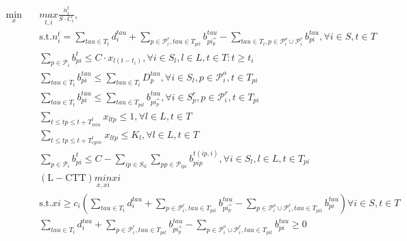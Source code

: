 \begin{align}
  \min_{x}\quad & \underset{t , i}{max} \frac{n_{i}^{t}}{S \cdot C_{i}} , \tag{eq\_0007} \\
  & \text{s}.\text{t}. n_{i}^{t} = \sum_{\mathit{tau} \in T_{t}} d_{i}^{\mathit{tau}} + \sum_{p \in \mathcal{P}_{i}^{r}, \mathit{tau} \in T_{p i t}} b_{p i_{p}^{+}}^{\mathit{tau}} - \sum_{\mathit{tau} \in T_{t}, p \in \mathcal{P}_{i}^{o} \cup \mathcal{P}_{i}^{r}} b_{p i}^{\mathit{tau}} , \forall i \in S , t \in T \tag{eq\_0008} \\
  & \sum_{p \in \mathcal{P}_{i}} b_{p i}^{t} \leq C \cdot x_{l \left(t - t_{i}\right)} , \forall i \in S_{l} , l \in L , t \in T : t \geq t_{i} \tag{eq\_0009} \\
  & \sum_{\mathit{tau} \in T_{t}} b_{p i}^{\mathit{tau}} \leq \sum_{\mathit{tau} \in T_{t}} D_{p}^{\mathit{tau}} , \forall i \in S_{l} , p \in \mathcal{P}_{i}^{o} , t \in T_{p i} \tag{eq\_0010} \\
  & \sum_{\mathit{tau} \in T_{t}} b_{p i}^{\mathit{tau}} \leq \sum_{\mathit{tau} \in T_{p i t}} b_{p i_{p}^{+}}^{\mathit{tau}} , \forall i \in S_{p}^{r} , p \in \mathcal{P}_{i}^{r} , t \in T_{p i} \tag{eq\_0011} \\
  & \sum_{t \leq tp \leq t + T_{m i n}^{l}} x_{l tp} \leq 1 , \forall l \in L , t \in T \tag{eq\_0012} \\
  & \sum_{t \leq tp \leq t + T_{c y c l e}^{l}} x_{l tp} \leq K_{l} , \forall l \in L , t \in T \tag{eq\_0013} \\
  & \sum_{p \in \mathcal{P}_{i}} b_{p i}^{t} \leq C - \sum_{ip \in S_{i l}} \underset{pp \in \mathcal{P}_{ip i}}{\sum} b_{p ip}^{t \left(ip , i\right)} , \forall i \in S_{l} , l \in L , t \in T_{p i} \tag{eq\_0018} \\
  & (\text{L}-\text{CTT}) \underset{x , \mathit{xi}}{min} \mathit{xi} \tag{eq\_0019} \\
  & \text{s}.\text{t}. \mathit{xi} \geq c_{i} \left(\sum_{\mathit{tau} \in T_{t}} d_{i}^{\mathit{tau}} + \sum_{p \in \mathcal{P}_{i}^{r}, \mathit{tau} \in T_{p i t}} b_{p i_{p}^{+}}^{\mathit{tau}} - \sum_{p \in \mathcal{P}_{i}^{o} \cup \mathcal{P}_{i}^{r}, \mathit{tau} \in T_{p i t}} b_{p i}^{\mathit{tau}}\right) \forall i \in S , t \in T \tag{eq\_0020} \\
  & \sum_{\mathit{tau} \in T_{t}} d_{i}^{\mathit{tau}} + \sum_{p \in \mathcal{P}_{i}^{r}, \mathit{tau} \in T_{p i t}} b_{p i_{p}^{+}}^{\mathit{tau}} - \sum_{p \in \mathcal{P}_{i}^{o} \cup \mathcal{P}_{i}^{r}, \mathit{tau} \in T_{p i t}} b_{p i}^{\mathit{tau}} \geq 0 \tag{eq\_0024} \\

\end{align}
